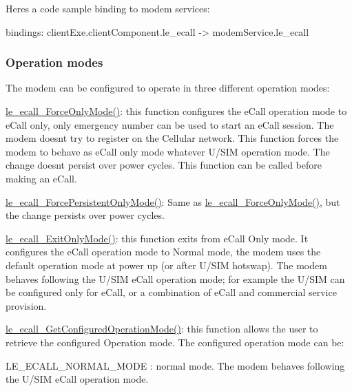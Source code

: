 Here\textquotesingle{}s a code sample binding to modem services\+: \begin{DoxyVerb}bindings:
{
   clientExe.clientComponent.le_ecall -> modemService.le_ecall
}
\end{DoxyVerb}
\hypertarget{c_ecall_le_ecall_operation}{}\subsubsection{Operation modes}\label{c_ecall_le_ecall_operation}
The modem can be configured to operate in three different operation modes\+:
\begin{DoxyItemize}
\item \hyperlink{le__ecall__interface_8h_a042d52c84b5b679ab32dd814c5b0be9e}{le\+\_\+ecall\+\_\+\+Force\+Only\+Mode()}\+: this function configures the e\+Call operation mode to e\+Call only, only emergency number can be used to start an e\+Call session. The modem doesn\textquotesingle{}t try to register on the Cellular network. This function forces the modem to behave as e\+Call only mode whatever U/\+S\+I\+M operation mode. The change doesn\textquotesingle{}t persist over power cycles. This function can be called before making an e\+Call.
\item \hyperlink{le__ecall__interface_8h_ad468828b0024de378d91ea9c30fd6f3f}{le\+\_\+ecall\+\_\+\+Force\+Persistent\+Only\+Mode()}\+: Same as \hyperlink{le__ecall__interface_8h_a042d52c84b5b679ab32dd814c5b0be9e}{le\+\_\+ecall\+\_\+\+Force\+Only\+Mode()}, but the change persists over power cycles.
\item \hyperlink{le__ecall__interface_8h_a924114fa7fab10c3f351766a76134f34}{le\+\_\+ecall\+\_\+\+Exit\+Only\+Mode()}\+: this function exits from e\+Call Only mode. It configures the e\+Call operation mode to Normal mode, the modem uses the default operation mode at power up (or after U/\+S\+I\+M hotswap). The modem behaves following the U/\+S\+I\+M e\+Call operation mode; for example the U/\+S\+I\+M can be configured only for e\+Call, or a combination of e\+Call and commercial service provision.
\item \hyperlink{le__ecall__interface_8h_a8e245065491b14f46405e415ea17b6b8}{le\+\_\+ecall\+\_\+\+Get\+Configured\+Operation\+Mode()}\+: this function allows the user to retrieve the configured Operation mode. The configured operation mode can be\+:
\begin{DoxyItemize}
\item {\ttfamily L\+E\+\_\+\+E\+C\+A\+L\+L\+\_\+\+N\+O\+R\+M\+A\+L\+\_\+\+M\+O\+D\+E} \+: normal mode. The modem behaves following the U/\+S\+I\+M e\+Call operation mode.

\end{DoxyItemize}
\end{DoxyItemize}
